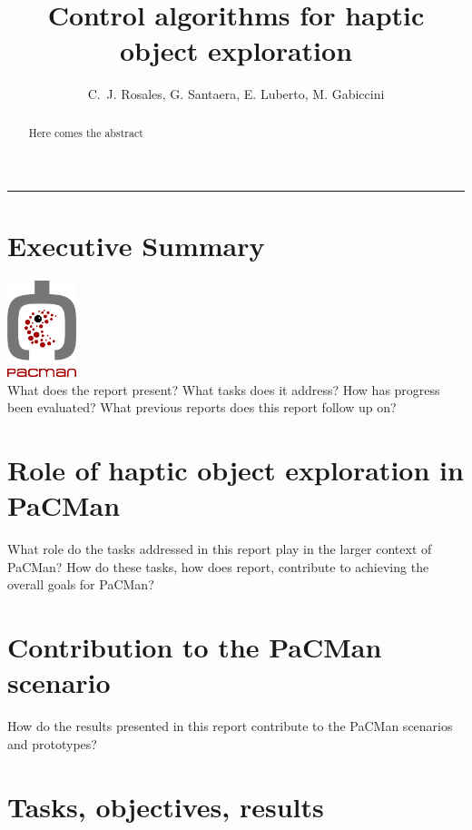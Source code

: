 \documentclass[a4paper,11pt,pdf]{pacmanreport}
\title{Control algorithms for haptic object exploration}
\author{C.~J. Rosales, G. Santaera, E. Luberto, M. Gabiccini}
\begin{document}
\maketitle

\begin{abstract}
\noindent Here comes the abstract
\end{abstract}


\vspace{.2em}
\hrule

\footnotesize

\tableofcontents

\normalsize

\newpage

\section*{Executive Summary}
\includegraphics[height=80pt]{pacmanlogo.png}\\
What does the report present? What tasks does it address? How has progress been evaluated? What previous reports does this report follow up on?

\section*{Role of haptic object exploration in PaCMan}

What role do the tasks addressed in this report play in the larger context of PaCMan? How do these tasks, how does report, contribute to achieving the overall goals for PaCMan?

\section*{Contribution to the PaCMan scenario}

How do the results presented in this report contribute to the PaCMan scenarios and prototypes?


\newpage

\section{Tasks, objectives, results}
\end{document}
